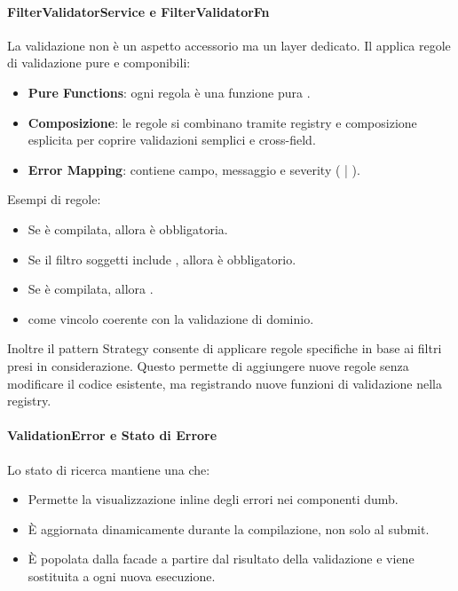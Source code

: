 \paragraph{FilterValidatorService e FilterValidatorFn}
La validazione non è un aspetto accessorio ma un layer dedicato. Il  applica regole di validazione pure e componibili:

\begin{itemize}
    \item \textbf{Pure Functions}: ogni regola è una funzione pura .
    \item \textbf{Composizione}: le regole si combinano tramite registry e composizione esplicita per coprire validazioni semplici e cross-field.
    \item \textbf{Error Mapping}:  contiene campo, messaggio e severity ( | ).
\end{itemize}

Esempi di regole:
\begin{itemize}
    \item Se  è compilata, allora  è obbligatoria.
    \item Se il filtro soggetti include , allora  è obbligatorio.
    \item Se  è compilata, allora .
    \item {} come vincolo coerente con la validazione di dominio.
\end{itemize}
Inoltre il pattern Strategy consente di applicare regole specifiche in base ai filtri presi in considerazione. Questo permette di aggiungere nuove regole senza modificare il codice esistente, ma registrando nuove funzioni di validazione nella registry.

\paragraph{ValidationError e Stato di Errore}
Lo stato di ricerca mantiene una  che:
\begin{itemize}
    \item Permette la visualizzazione inline degli errori nei componenti dumb.
    \item È aggiornata dinamicamente durante la compilazione, non solo al submit.
    \item È popolata dalla facade a partire dal risultato della validazione e viene sostituita a ogni nuova esecuzione.
\end{itemize}
